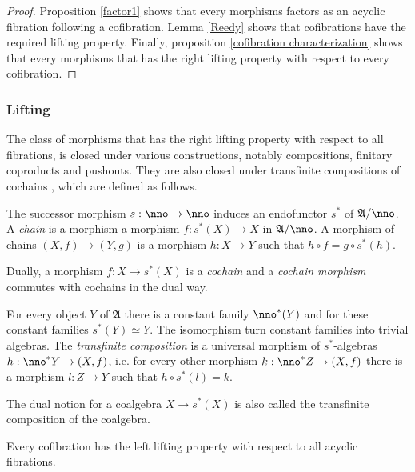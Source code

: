 \documentclass{tac}
\newcommand\hide[1]{}
\newcommand\ri{^*}
\newcommand\of{:}
\newcommand\ambient{\mathfrak A}
\begin{document}
\begin{proof} Proposition \ref{factor1} shows that every morphisms factors as an acyclic fibration following a cofibration. Lemma \ref{Reedy} shows that cofibrations have the required lifting property. Finally, proposition \ref{cofibration characterization} shows that every morphisms that has the right lifting property with respect to every cofibration.
\end{proof}


\subsubsection{Lifting}
The class of morphisms that has the right lifting property with respect to all fibrations, is closed under various constructions, notably compositions, finitary coproducts and pushouts. They are also closed under transfinite compositions of cochains \hide{lemma...}, which are defined as follows.

\begin{definition} The successor morphism $s\of\nno\to\nno$ induces an endofunctor $s\ri$ of $\ambient/\nno$. A \emph{chain} is a morphism a morphism $f\of s\ri(X)\to X$ in $\ambient/\nno$.  A morphism of chains $(X,f)\to(Y,g)$ is a morphism $h\of X\to Y$ such that $h\circ f = g\circ s\ri(h)$.

Dually, a morphism $f\of X\to s\ri(X)$ is a \emph{cochain} and a \emph{cochain morphism} commutes with cochains in the dual way.

For every object $Y$ of $\ambient$ there is a constant family $\nno\ri(Y)$ and for these constant families $s\ri(Y)\simeq Y$. The isomorphism turn constant families into trivial algebras. The \emph{transfinite composition} is a universal morphism of $s\ri$-algebras $h\of \nno\ri Y\to (X,f)$, i.e. for every other morphism $k\of \nno\ri Z\to (X,f)$ there is a morphism $l\of Z\to Y$ such that $h\circ s\ri(l)=k$.

The dual notion for a coalgebra $X\to s\ri(X)$ is also called the transfinite composition of the coalgebra.
\end{definition}\hide{Every isomorphism-algebra is a constant family.}

\begin{lemma} Every cofibration has the left lifting property with respect to all acyclic fibrations. \label{Reedy}\end{lemma}
\end{document}
